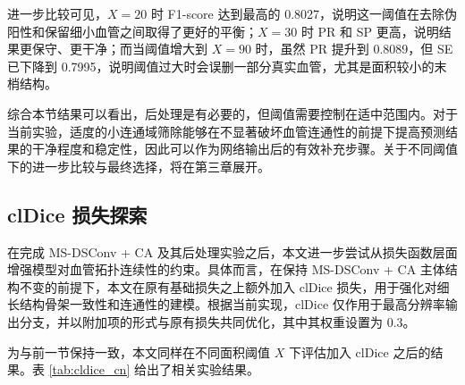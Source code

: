 \documentclass[a4paper,12pt]{article}
\begin{document}
进一步比较可见，\(X=20\) 时 F1-score 达到最高的 0.8027，说明这一阈值在去除伪阳性和保留细小血管之间取得了更好的平衡；\(X=30\) 时 PR 和 SP 更高，说明结果更保守、更干净；而当阈值增大到 \(X=90\) 时，虽然 PR 提升到 0.8089，但 SE 已下降到 0.7995，说明阈值过大时会误删一部分真实血管，尤其是面积较小的末梢结构。

综合本节结果可以看出，后处理是有必要的，但阈值需要控制在适中范围内。对于当前实验，适度的小连通域筛除能够在不显著破坏血管连通性的前提下提高预测结果的干净程度和稳定性，因此可以作为网络输出后的有效补充步骤。关于不同阈值下的进一步比较与最终选择，将在第三章展开。

\subsection{clDice 损失探索}

在完成 MS-DSConv + CA 及其后处理实验之后，本文进一步尝试从损失函数层面增强模型对血管拓扑连续性的约束。具体而言，在保持 MS-DSConv + CA 主体结构不变的前提下，本文在原有基础损失之上额外加入 clDice 损失，用于强化对细长结构骨架一致性和连通性的建模。根据当前实现，clDice 仅作用于最高分辨率输出分支，并以附加项的形式与原有损失共同优化，其中其权重设置为 0.3。

为与前一节保持一致，本文同样在不同面积阈值 \(X\) 下评估加入 clDice 之后的结果。表 \ref{tab:cldice_cn} 给出了相关实验结果。

\begin{table}[htbp]
\centering
\caption{加入 clDice 后在不同后处理阈值下的结果对比}
\label{tab:cldice_cn}
\end{table}
\end{document}
